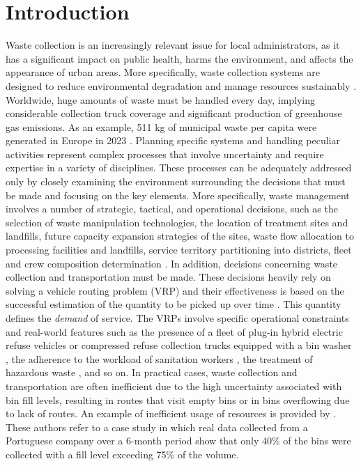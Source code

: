 \documentclass[preprint,11pt,authoryear]{elsarticle}
\begin{document}
\section{Introduction}\label{intro}
Waste collection is an increasingly relevant issue for local administrators, as it has a significant impact on public health, harms the environment, and affects the appearance of urban areas. More specifically, waste collection systems are designed to reduce environmental degradation and manage resources sustainably \citep{Wei2025}. Worldwide, huge amounts of waste must be handled every day, implying considerable collection truck coverage and significant production of greenhouse gas emissions. As an example, 511 kg of municipal waste per capita were generated in Europe in 2023 \citep{Eurostat2025}.   
Planning specific systems and handling peculiar activities represent complex processes that involve uncertainty and require expertise in a variety of disciplines. These processes can be adequately addressed only by closely examining the environment surrounding the decisions that must be made and focusing on the key elements.
More specifically, waste management involves a number of strategic, tactical, and operational decisions, such as the selection of waste manipulation technologies, the location of treatment sites and landfills, future capacity expansion strategies of the sites, waste flow allocation to processing facilities and landfills, service territory partitioning into districts, fleet and crew composition determination \citep{Ghiani2014}. In addition, decisions concerning waste collection and transportation must be made. These decisions heavily rely on solving a vehicle routing problem (VRP) and their effectiveness is based on the successful estimation of the quantity to be picked up over time \citep{Hess2024}. This quantity defines the \textit{demand} of service. The VRPs involve specific operational constraints and real-world features such as the presence of a fleet of plug-in hybrid electric refuse vehicles \citep{Masmoudi2022} or compressed refuse collection trucks equipped with a bin washer \citep{Masmoudi2024}, the adherence to the workload of sanitation workers \citep{Zhang2025}, the treatment of hazardous waste \citep{Hu2002}, and so on.  
%
In practical cases, waste collection and transportation are often inefficient due to the high uncertainty associated with bin fill levels, resulting in routes that visit empty bins or in bins overflowing due to lack of routes. An example of inefficient usage of resources is provided by \cite{Ramos2018}. These authors refer to a case study in which real data collected from a Portuguese company over a 6-month period show that only 40\% of the bins were collected with a fill level exceeding 75\% of the volume. 
\end{document}
